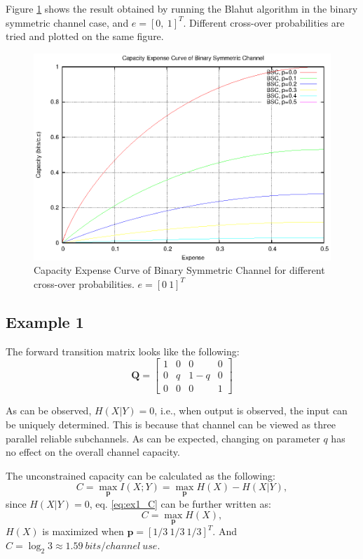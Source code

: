 \documentclass[a4paper,10pt]{article}
\begin{document}
Figure \ref{fig:bsc_cap} shows the result obtained by running the Blahut algorithm in the binary symmetric channel case, and $e=[0,\ 1]^T$. Different cross-over probabilities are tried and plotted on the same figure.
\begin{figure}
 \centering
 \includegraphics{pic/bsc_cap.eps}
 \caption{Capacity Expense Curve of Binary Symmetric Channel for different cross-over probabilities. $e=[0\ 1]^T$}
 \label{fig:bsc_cap}
\end{figure}

\subsection{Example 1}
The forward transition matrix looks like the following:
\[
 \mathbf{Q} = \left[ 
\begin{array}{cccc}
1 & 0 & 0 & 0 \\ 
0 & q & 1-q & 0 \\ 
0 & 0 & 0 & 1
\end{array}\right] 
\]

As can be observed, $H(X|Y)=0$, i.e., when output is observed, the input can be uniquely determined. This is because that channel can be viewed as three parallel reliable subchannels. As can be expected, changing on parameter $q$ has no effect on the overall channel capacity.

The unconstrained capacity can be calculated as the following:
\begin{equation}
 C=\max_{\mathbf{p}} {I(X;Y)}=\max_{\mathbf{p}} {H(X)-H(X|Y)},
\label{eq:ex1_C}
\end{equation}
since $H(X|Y)=0$, eq. \ref{eq:ex1_C} can be further written as:
\begin{equation}
 C=\max_{\mathbf{p}}{H(X)},
\end{equation}
$H(X)$ is maximized when $\mathbf{p}=[1/3\ 1/3\ 1/3]^T$. And $C=\log_2{3}\approx1.59\ bits/channel\ use$.
\end{document}
